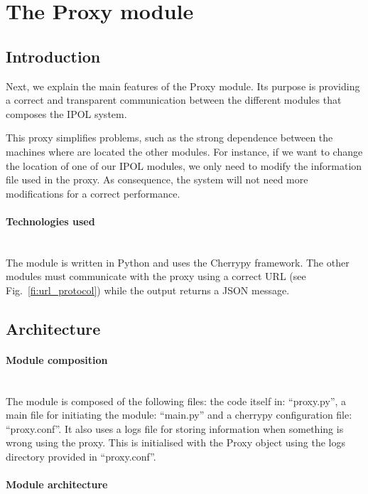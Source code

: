 \section{The Proxy module}

\subsection{Introduction}
\label{sec:proxy_introduction}

Next, we explain the main features of the Proxy module. Its purpose is providing a correct and transparent communication between the different modules that composes the IPOL system. 

This proxy simplifies problems, such as the strong dependence between the machines where are located the other modules. For instance, if we want to change the location of one of our IPOL modules, we only need to modify the information file used in the proxy. As consequence, the system will not need more modifications for a correct performance.

\paragraph{Technologies used} \hspace{0pt} \\
The module is written in Python and uses the Cherrypy framework. The other modules must communicate with the proxy using a correct URL (see Fig.~\ref{fi:url_protocol}) while the output returns a JSON message.

\subsection{Architecture}

\paragraph{Module composition} \hspace{0pt} \\
The module is composed of the following files: the code itself in: ``proxy.py'', a main file for initiating the module: ``main.py''  and a cherrypy configuration file: ``proxy.conf''.  
It also uses a logs file for storing information when something is wrong using the proxy. This is initialised with the Proxy object using the logs directory provided in ``proxy.conf''.

\paragraph{Module architecture} \hspace{0pt} \\

